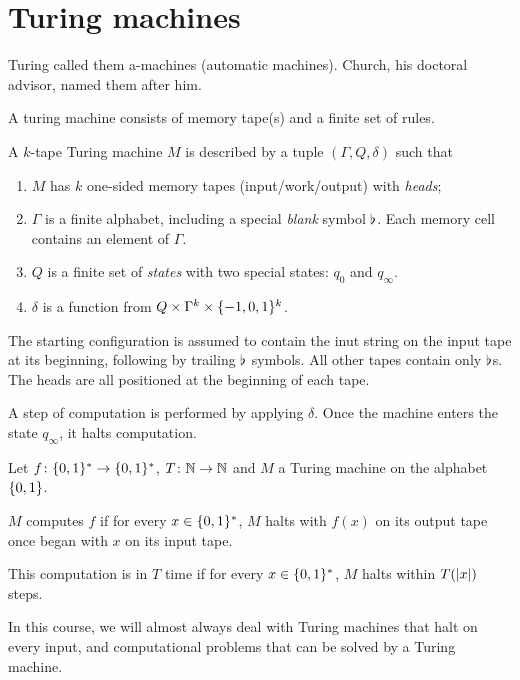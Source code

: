 \chapter{Turing machines} \label{chp:turing}
Turing called them a-machines (automatic machines).
Church, his doctoral advisor, named them after him.

A turing machine consists of memory tape(s) and a finite set of rules.
\begin{definition}
    A $k$-tape Turing machine $M$ is described by a tuple
    $(\Gamma, Q, \delta)$ such that
    \begin{enumerate}
        \item $M$ has $k$ one-sided memory tapes (input/work/output)
            with \emph{heads};
        \item $\Gamma$ is a finite alphabet, including a special
            \emph{blank} symbol $\flat$.
            Each memory cell contains an element of $\Gamma$.
        \item $Q$ is a finite set of \emph{states} with two special states:
            $q_0$ and $q_\infty$.
        \item $\delta$ is a function from
            $Q \times \Gamma^k \times \{-1, 0, 1\}^k$.
    \end{enumerate}
    The starting configuration is assumed to contain the inut string on the
    input tape at its beginning, following by trailing $\flat$ symbols.
    All other tapes contain only $\flat$s.
    The heads are all positioned at the beginning of each tape.

    A step of computation is performed by applying $\delta$.
    Once the machine enters the state $q_\infty$, it halts computation.
\end{definition}

Let $f\colon \{0, 1\}^* \to \{0, 1\}^*$, $T\colon \mathbb{N} \to \mathbb{N}$ and
$M$ a Turing machine on the alphabet $\{0, 1\}$.
\begin{definition} \label{def:runtime}
    $M$ computes $f$ if for every $x \in \{0, 1\}^*$,
    $M$ halts with $f(x)$ on its output tape once began with $x$ on its
    input tape.

    This computation is in $T$ time if for every $x \in \{0, 1\}^*$,
    $M$ halts within $T(\lvert x\rvert)$ steps.
\end{definition}

In this course, we will almost always deal with Turing machines that halt on
every input, and computational problems that can be solved by a Turing
machine.

